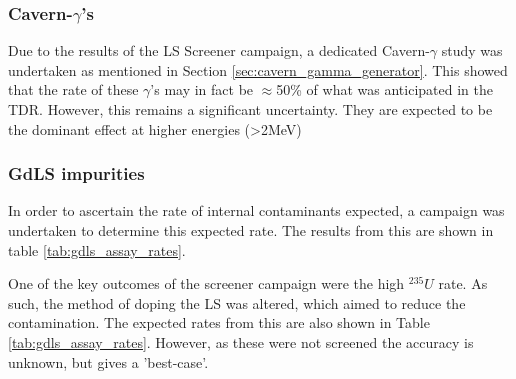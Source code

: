 \subsubsection{Cavern-$\gamma$'s}
\par
Due to the results of the LS Screener campaign, a dedicated Cavern-$\gamma$ study was undertaken as mentioned in Section \ref{sec:cavern_gamma_generator}.
This showed that the rate of these $\gamma$'s may in fact be $\approx$50\% of what was anticipated in the TDR.
However, this remains a significant uncertainty.
They are expected to be the dominant effect at higher energies (>2MeV)




\subsubsection{GdLS impurities}
\par
In order to ascertain the rate of internal contaminants expected, a campaign was undertaken \cite{scotthaselschwardt_thesis_ref} to determine this expected rate.
The results from this are shown in table \ref{tab:gdls_assay_rates}.
\par
One of the key outcomes of the screener campaign were the high ${}^{235}U$ rate.
As such, the method of doping the LS was altered, which aimed to reduce the contamination.
The expected rates from this are also shown in Table \ref{tab:gdls_assay_rates}.
However, as these were not screened the accuracy is unknown, but gives a 'best-case'.


